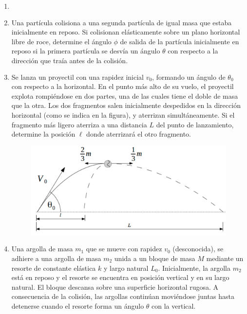 \documentclass[letterpaper,11pt]{article}
\begin{document}
\vspace{-1cm}
\begin{enumerate}\setlength{\itemsep}{0.4cm}


\item[]

\item Una partícula colisiona a una segunda partícula de igual masa que estaba inicialmente en reposo. Si colisionan elásticamente sobre un plano horizontal libre de roce, determine el ángulo $\phi$ de salida de la partícula inicialmente en reposo si la primera partícula se desvía un ángulo $\theta$ con respecto a la dirección que traía antes de la colisión.

\begin{figure}[htbp]
  \centering
  
\end{figure}

\item Se lanza un proyectil con una rapidez inicial $v_0$, formando un ángulo de $\theta_0$ con respecto a la horizontal. En el punto más alto de su vuelo, el proyectil explota rompiéndose en dos partes, una de las cuales tiene el doble de masa que la otra. Los dos fragmentos salen inicialmente despedidos en la dirección horizontal (como se indica en la figura), y aterrizan simultáneamente. Si el fragmento más ligero aterriza a una distancia $L$ del punto de lanzamiento, determine la posición $\ell$ donde aterrizará el otro fragmento.

\begin{figure}[H]
    \centering
    \includegraphics[width=0.4\linewidth]{2021-2/img/aux11/proyectil.PNG}
\end{figure}

\item Una argolla de masa $m_1$ que se mueve con rapidez $v_0$ (desconocida), se adhiere a una argolla de masa $m_2$ unida a un bloque de masa $M$ mediante un resorte de constante elástica $k$ y largo natural $L_0$. Inicialmente, la argolla $m_2$ está en reposo y el resorte se encuentra en posición vertical y en su largo natural. El bloque descansa sobre una superficie horizontal rugosa. A consecuencia de la colisión, las argollas continúan moviéndose juntas hasta detenerse cuando el resorte forma un ángulo $\theta$ con la vertical.
    

\end{enumerate}
\end{document}
